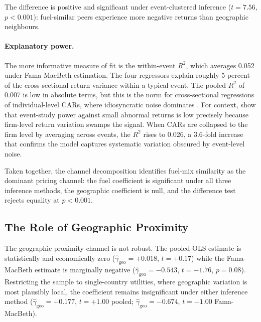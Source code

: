 \documentclass[12pt,a4paper]{article}
\begin{document}
The difference is positive and significant under event-clustered inference ($t = 7.56$, $p < 0.001$): fuel-similar peers experience more negative returns than geographic neighbours.

\paragraph{Explanatory power.} The more informative measure of fit is the within-event $R^2$, which averages 0.052 under Fama-MacBeth estimation. The four regressors explain roughly 5 percent of the cross-sectional return variance within a typical event. The pooled $R^2$ of 0.007 is low in absolute terms, but this is the norm for cross-sectional regressions of individual-level CARs, where idiosyncratic noise dominates \citep{CampbellLoMacKinlay1997}. For context, \citet{BrownWarner1985} show that event-study power against small abnormal returns is low precisely because firm-level return variation swamps the signal. When CARs are collapsed to the firm level by averaging across events, the $R^2$ rises to 0.026, a 3.6-fold increase that confirms the model captures systematic variation obscured by event-level noise.

Taken together, the channel decomposition identifies fuel-mix similarity as the dominant pricing channel: the fuel coefficient is significant under all three inference methods, the geographic coefficient is null, and the difference test rejects equality at $p < 0.001$.



\subsection{The Role of Geographic Proximity}\label{sec:geo_role}

The geographic proximity channel is not robust. The pooled-OLS estimate is statistically and economically zero ($\hat\gamma_{\mathrm{geo}} = +0.018$, $t = +0.17$) while the Fama-MacBeth estimate is marginally negative ($\hat\gamma_{\mathrm{geo}} = -0.543$, $t = -1.76$, $p = 0.08$). Restricting the sample to single-country utilities, where geographic variation is most plausibly local, the coefficient remains insignificant under either inference method ($\hat\gamma_{\mathrm{geo}} = +0.177$, $t = +1.00$ pooled; $\hat\gamma_{\mathrm{geo}} = -0.674$, $t = -1.00$ Fama-MacBeth).
\end{document}
